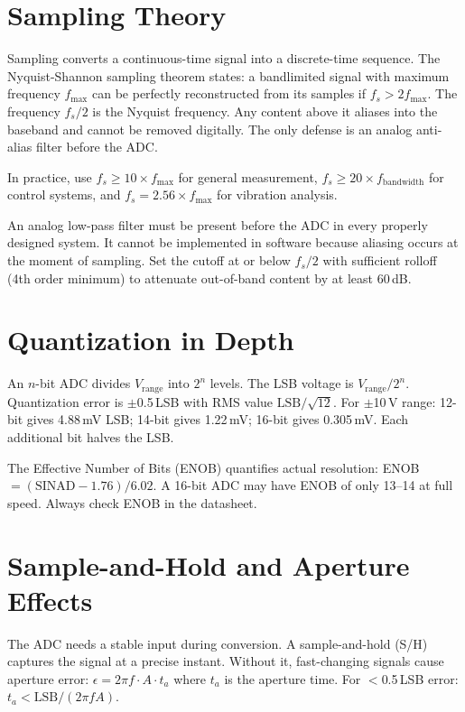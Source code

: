 \documentclass[11pt,letterpaper,twoside,openany]{book}
\begin{document}
\section{Sampling Theory}
Sampling converts a continuous-time signal into a discrete-time sequence. The Nyquist-Shannon sampling theorem states: a bandlimited signal with maximum frequency $f_{\max}$ can be perfectly reconstructed from its samples if $f_s > 2f_{\max}$. The frequency $f_s/2$ is the Nyquist frequency. Any content above it aliases into the baseband and cannot be removed digitally. The only defense is an analog anti-alias filter before the ADC.

In practice, use $f_s \geq 10 \times f_{\max}$ for general measurement, $f_s \geq 20 \times f_{\text{bandwidth}}$ for control systems, and $f_s = 2.56 \times f_{\max}$ for vibration analysis.

\begin{warningbox}
An analog low-pass filter must be present before the ADC in every properly designed system. It cannot be implemented in software because aliasing occurs at the moment of sampling. Set the cutoff at or below $f_s/2$ with sufficient rolloff (4th order minimum) to attenuate out-of-band content by at least 60\,dB.
\end{warningbox}

\section{Quantization in Depth}
An $n$-bit ADC divides $V_{\text{range}}$ into $2^n$ levels. The LSB voltage is $V_{\text{range}}/2^n$. Quantization error is $\pm$0.5\,LSB with RMS value $\text{LSB}/\sqrt{12}$. For $\pm$10\,V range: 12-bit gives 4.88\,mV LSB; 14-bit gives 1.22\,mV; 16-bit gives 0.305\,mV. Each additional bit halves the LSB.

The Effective Number of Bits (ENOB) quantifies actual resolution: ENOB $= (\text{SINAD} - 1.76)/6.02$. A 16-bit ADC may have ENOB of only 13--14 at full speed. Always check ENOB in the datasheet.

\section{Sample-and-Hold and Aperture Effects}
The ADC needs a stable input during conversion. A sample-and-hold (S/H) captures the signal at a precise instant. Without it, fast-changing signals cause aperture error: $\epsilon = 2\pi f \cdot A \cdot t_a$ where $t_a$ is the aperture time. For $<$0.5\,LSB error: $t_a < \text{LSB}/(2\pi f A)$.
\end{document}
